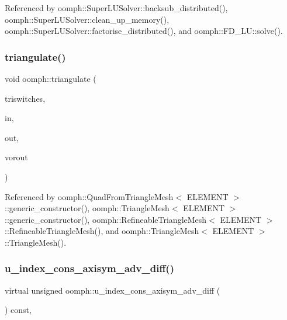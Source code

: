Referenced by oomph\+::\+Super\+L\+U\+Solver\+::backsub\+\_\+distributed(), oomph\+::\+Super\+L\+U\+Solver\+::clean\+\_\+up\+\_\+memory(), oomph\+::\+Super\+L\+U\+Solver\+::factorise\+\_\+distributed(), and oomph\+::\+F\+D\+\_\+\+L\+U\+::solve().

\mbox{\label{namespaceoomph_a3af531b221ad8fe56e4f9e3364435b87}} 
\subsubsection{\texorpdfstring{triangulate()}{triangulate()}}
{\footnotesize\ttfamily void oomph\+::triangulate (\begin{DoxyParamCaption}\item[{char $\ast$}]{triswitches,  }\item[{struct \hyperlink{structoomph_1_1TriangulateIO}{oomph\+::\+Triangulate\+IO} $\ast$}]{in,  }\item[{struct \hyperlink{structoomph_1_1TriangulateIO}{oomph\+::\+Triangulate\+IO} $\ast$}]{out,  }\item[{struct \hyperlink{structoomph_1_1TriangulateIO}{oomph\+::\+Triangulate\+IO} $\ast$}]{vorout }\end{DoxyParamCaption})}



Referenced by oomph\+::\+Quad\+From\+Triangle\+Mesh$<$ E\+L\+E\+M\+E\+N\+T $>$\+::generic\+\_\+constructor(), oomph\+::\+Triangle\+Mesh$<$ E\+L\+E\+M\+E\+N\+T $>$\+::generic\+\_\+constructor(), oomph\+::\+Refineable\+Triangle\+Mesh$<$ E\+L\+E\+M\+E\+N\+T $>$\+::\+Refineable\+Triangle\+Mesh(), and oomph\+::\+Triangle\+Mesh$<$ E\+L\+E\+M\+E\+N\+T $>$\+::\+Triangle\+Mesh().

\mbox{\label{namespaceoomph_a03ba213638004c56b6417e159f16892f}} 
\subsubsection{\texorpdfstring{u\+\_\+index\+\_\+cons\+\_\+axisym\+\_\+adv\+\_\+diff()}{u\_index\_cons\_axisym\_adv\_diff()}}
{\footnotesize\ttfamily virtual unsigned oomph\+::u\+\_\+index\+\_\+cons\+\_\+axisym\+\_\+adv\+\_\+diff (\begin{DoxyParamCaption}{ }\end{DoxyParamCaption}) const\hspace{0.3cm}{\ttfamily [inline]}, {\ttfamily [virtual]}}



